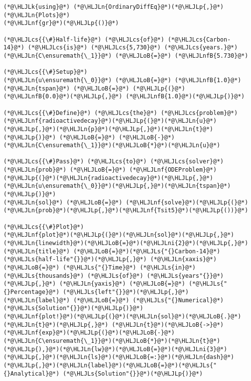 \documentclass[12pt,a4paper]{article}
\newcommand{\HLJLk}[1]{\textcolor[RGB]{148,91,176}{\textbf{#1}}}
\newcommand{\HLJLn}[1]{#1}
\newcommand{\HLJLnf}[1]{\textcolor[RGB]{66,102,213}{#1}}
\newcommand{\HLJLs}[1]{\textcolor[RGB]{201,61,57}{#1}}
\newcommand{\HLJLnfB}[1]{\textcolor[RGB]{59,151,46}{#1}}
\newcommand{\HLJLni}[1]{\textcolor[RGB]{59,151,46}{#1}}
\newcommand{\HLJLoB}[1]{\textcolor[RGB]{102,102,102}{\textbf{#1}}}
\newcommand{\HLJLp}[1]{#1}
\newcommand{\HLJLcs}[1]{\textcolor[RGB]{153,153,119}{\textit{#1}}}
\begin{document}
\begin{lstlisting}
(*@\HLJLk{using}@*) (*@\HLJLn{OrdinaryDiffEq}@*)(*@\HLJLp{,}@*) (*@\HLJLn{Plots}@*)
(*@\HLJLnf{gr}@*)(*@\HLJLp{()}@*)

(*@\HLJLcs{{\#}Half-life}@*) (*@\HLJLcs{of}@*) (*@\HLJLcs{Carbon-14}@*) (*@\HLJLcs{is}@*) (*@\HLJLcs{5,730}@*) (*@\HLJLcs{years.}@*)
(*@\HLJLn{C\ensuremath{\_1}}@*) (*@\HLJLoB{=}@*) (*@\HLJLnfB{5.730}@*)

(*@\HLJLcs{{\#}Setup}@*)
(*@\HLJLn{u\ensuremath{\_0}}@*) (*@\HLJLoB{=}@*) (*@\HLJLnfB{1.0}@*)
(*@\HLJLn{tspan}@*) (*@\HLJLoB{=}@*) (*@\HLJLp{(}@*)(*@\HLJLnfB{0.0}@*)(*@\HLJLp{,}@*) (*@\HLJLnfB{1.0}@*)(*@\HLJLp{)}@*)

(*@\HLJLcs{{\#}Define}@*) (*@\HLJLcs{the}@*) (*@\HLJLcs{problem}@*)
(*@\HLJLnf{radioactivedecay}@*)(*@\HLJLp{(}@*)(*@\HLJLn{u}@*)(*@\HLJLp{,}@*)(*@\HLJLn{p}@*)(*@\HLJLp{,}@*)(*@\HLJLn{t}@*)(*@\HLJLp{)}@*) (*@\HLJLoB{=}@*) (*@\HLJLoB{-}@*)(*@\HLJLn{C\ensuremath{\_1}}@*)(*@\HLJLoB{*}@*)(*@\HLJLn{u}@*)

(*@\HLJLcs{{\#}Pass}@*) (*@\HLJLcs{to}@*) (*@\HLJLcs{solver}@*)
(*@\HLJLn{prob}@*) (*@\HLJLoB{=}@*) (*@\HLJLnf{ODEProblem}@*)(*@\HLJLp{(}@*)(*@\HLJLn{radioactivedecay}@*)(*@\HLJLp{,}@*)(*@\HLJLn{u\ensuremath{\_0}}@*)(*@\HLJLp{,}@*)(*@\HLJLn{tspan}@*)(*@\HLJLp{)}@*)
(*@\HLJLn{sol}@*) (*@\HLJLoB{=}@*) (*@\HLJLnf{solve}@*)(*@\HLJLp{(}@*)(*@\HLJLn{prob}@*)(*@\HLJLp{,}@*)(*@\HLJLnf{Tsit5}@*)(*@\HLJLp{())}@*)

(*@\HLJLcs{{\#}Plot}@*)
(*@\HLJLnf{plot}@*)(*@\HLJLp{(}@*)(*@\HLJLn{sol}@*)(*@\HLJLp{,}@*)(*@\HLJLn{linewidth}@*)(*@\HLJLoB{=}@*)(*@\HLJLni{2}@*)(*@\HLJLp{,}@*)(*@\HLJLn{title}@*) (*@\HLJLoB{=}@*)(*@\HLJLs{"{}Carbon-14}@*) (*@\HLJLs{half-life"{}}@*)(*@\HLJLp{,}@*) (*@\HLJLn{xaxis}@*) (*@\HLJLoB{=}@*) (*@\HLJLs{"{}Time}@*) (*@\HLJLs{in}@*) (*@\HLJLs{thousands}@*) (*@\HLJLs{of}@*) (*@\HLJLs{years"{}}@*)(*@\HLJLp{,}@*) (*@\HLJLn{yaxis}@*) (*@\HLJLoB{=}@*) (*@\HLJLs{"{}Percentage}@*) (*@\HLJLs{left"{}}@*)(*@\HLJLp{,}@*) (*@\HLJLn{label}@*) (*@\HLJLoB{=}@*) (*@\HLJLs{"{}Numerical}@*) (*@\HLJLs{Solution"{}}@*)(*@\HLJLp{)}@*)
(*@\HLJLnf{plot!}@*)(*@\HLJLp{(}@*)(*@\HLJLn{sol}@*)(*@\HLJLoB{.}@*)(*@\HLJLn{t}@*)(*@\HLJLp{,}@*) (*@\HLJLn{t}@*)(*@\HLJLoB{->}@*)(*@\HLJLnf{exp}@*)(*@\HLJLp{(}@*)(*@\HLJLoB{-}@*)(*@\HLJLn{C\ensuremath{\_1}}@*)(*@\HLJLoB{*}@*)(*@\HLJLn{t}@*)(*@\HLJLp{),}@*)(*@\HLJLn{lw}@*)(*@\HLJLoB{=}@*)(*@\HLJLni{3}@*)(*@\HLJLp{,}@*)(*@\HLJLn{ls}@*)(*@\HLJLoB{=:}@*)(*@\HLJLn{dash}@*)(*@\HLJLp{,}@*)(*@\HLJLn{label}@*)(*@\HLJLoB{=}@*)(*@\HLJLs{"{}Analytical}@*) (*@\HLJLs{Solution"{}}@*)(*@\HLJLp{)}@*)
\end{lstlisting}
\end{document}
